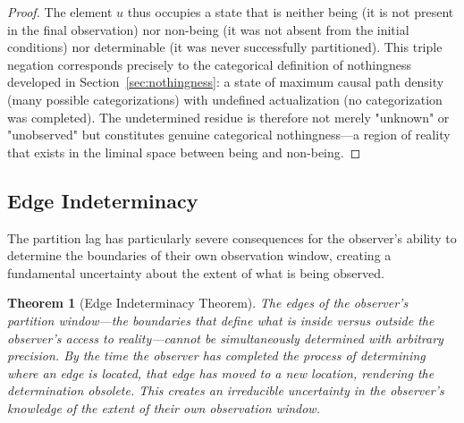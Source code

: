 \documentclass[12pt,a4paper]{article}
\newtheorem{theorem}{Theorem}[section]
\theoremstyle{definition}
\theoremstyle{remark}
\begin{document}
\begin{proof}
The element $u$ thus occupies a state that is neither being (it is not present in the final observation) nor non-being (it was not absent from the initial conditions) nor determinable (it was never successfully partitioned). This triple negation corresponds precisely to the categorical definition of nothingness developed in Section~\ref{sec:nothingness}: a state of maximum causal path density (many possible categorizations) with undefined actualization (no categorization was completed). The undetermined residue is therefore not merely "unknown" or "unobserved" but constitutes genuine categorical nothingness—a region of reality that exists in the liminal space between being and non-being.
\end{proof}

\subsection{Edge Indeterminacy}

The partition lag has particularly severe consequences for the observer's ability to determine the boundaries of their own observation window, creating a fundamental uncertainty about the extent of what is being observed.

\begin{theorem}[Edge Indeterminacy Theorem]
\label{thm:edge_indeterminacy}
The edges of the observer's partition window—the boundaries that define what is inside versus outside the observer's access to reality—cannot be simultaneously determined with arbitrary precision. By the time the observer has completed the process of determining where an edge is located, that edge has moved to a new location, rendering the determination obsolete. This creates an irreducible uncertainty in the observer's knowledge of the extent of their own observation window.
\end{theorem}
\end{document}
